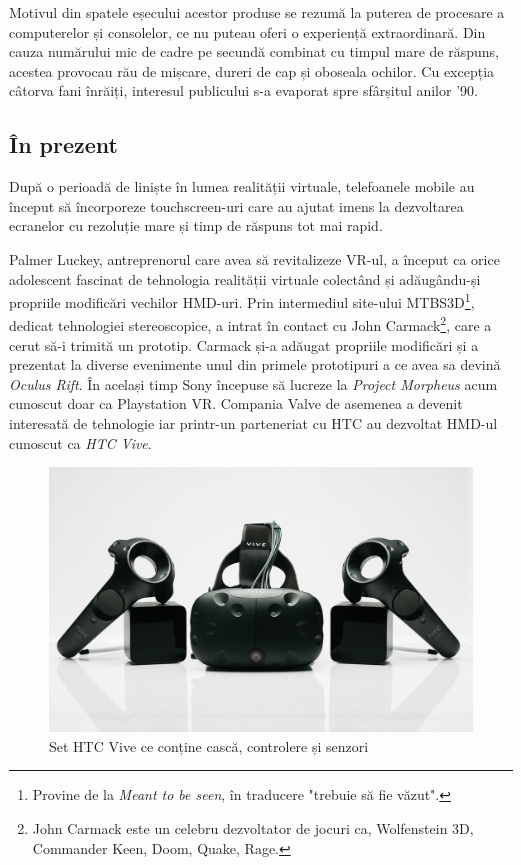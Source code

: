Motivul din spatele eșecului acestor produse se rezumă la puterea de procesare a computerelor și consolelor, ce nu puteau oferi o experiență extraordinară. Din cauza numărului mic de cadre pe secundă combinat cu timpul mare de răspuns, acestea provocau rău de mișcare, dureri de cap și oboseala ochilor. Cu excepția câtorva fani înrăiți, interesul publicului s-a evaporat spre sfârșitul anilor '90.

\subsection{În prezent}

După o perioadă de liniște în lumea realității virtuale, telefoanele mobile au început să încorporeze touchscreen-uri care au ajutat imens la dezvoltarea ecranelor cu rezoluție mare și timp de răspuns tot mai rapid.

Palmer Luckey, antreprenorul care avea să revitalizeze VR-ul, a început ca orice adolescent fascinat de tehnologia realității virtuale colectând și adăugându-și propriile modificări vechilor HMD-uri. Prin intermediul site-ului MTBS3D\footnote{Provine de la \textit{Meant to be seen}, în traducere "trebuie să fie văzut".}, dedicat tehnologiei stereoscopice, a intrat în contact cu John Carmack\footnote{John Carmack este un celebru dezvoltator de jocuri ca, Wolfenstein 3D, Commander Keen, Doom, Quake, Rage.}, care a cerut să-i trimită un prototip.
Carmack și-a adăugat propriile modificări și a prezentat la diverse evenimente unul din primele prototipuri a ce avea sa devină \textit{Oculus Rift}.
În același timp Sony începuse să lucreze la \textit{Project Morpheus} acum cunoscut doar ca Playstation VR. Compania Valve de asemenea a devenit interesată de tehnologie iar printr-un parteneriat cu HTC au dezvoltat HMD-ul cunoscut ca \textit{HTC Vive}.

\begin{figure}[h]
  \centering
  \includegraphics[scale=0.2]{img/htcvive.jpg}
  \caption{Set HTC Vive ce conține cască, controlere și senzori}
\end{figure}

